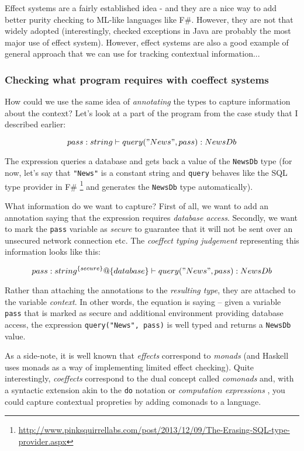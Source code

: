 Effect systems are a fairly established idea - and they are a nice way to add better purity checking
to ML-like languages like F\#. However, they are not that widely adopted (interestingly, checked
exceptions in Java are probably the most major use of effect system). However, effect systems are
also a good example of general approach that we can use for tracking contextual information...

\subsubsection{Checking what program requires with coeffect systems}

How could we use the same idea of \emph{annotating} the types to capture information about the context?
Let's look at a part of the program from the case study that I described earlier:

\begin{equation}
pass : string \vdash query("News", pass) : NewsDb
\end{equation}

The expression queries a database and gets back a value of the \texttt{NewsDb} type (for now, let's say
that \texttt{"News"} is a constant string and \texttt{query} behaves like the SQL type provider in F\# \footnote{\url{http://www.pinksquirrellabs.com/post/2013/12/09/The-Erasing-SQL-type-provider.aspx}}
and generates the \texttt{NewsDb} type automatically).

What information do we want to capture? First of all, we want to add an annotation saying that
the expression requires \emph{database access}. Secondly, we want to mark the \texttt{pass} variable as 
\emph{secure} to guarantee that it will not be sent over an unsecured network connection etc.
The \emph{coeffect typing judgement} representing this information looks like this:

\begin{equation}
pass : string^{\{secure\}} @ \{database\} \vdash query("News", pass) : NewsDb
\end{equation}

Rather than attaching the annotations to the \emph{resulting type}, they are attached to the 
variable \emph{context}. In other words, the equation is saying -- given a variable \texttt{pass} that is
marked as secure and additional environment providing database access, the expression
\texttt{query("News", pass)} is well typed and returns a \texttt{NewsDb} value.

As a side-note, it is well known that \emph{effects} correspond to \emph{monads} (and Haskell uses
monads as a way of implementing limited effect checking). Quite interestingly, \emph{coeffects}
correspond to the dual concept called \emph{comonads} and, with a syntactic extension akin to 
the \texttt{do} notation or \emph{computation expressions} \cite{xx}, you could capture contextual 
propreties by adding comonads to a language.

